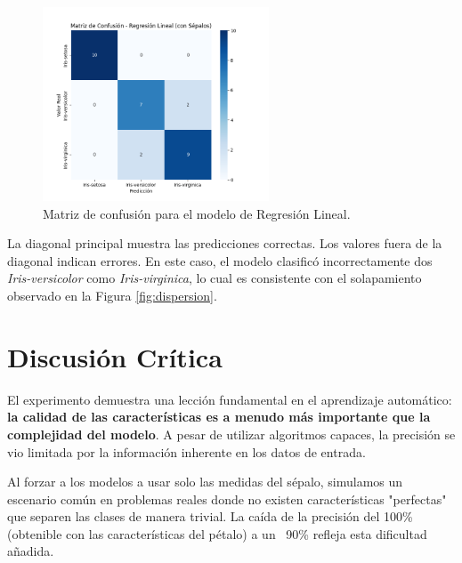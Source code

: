 \documentclass[12pt,a4paper]{article}
\begin{document}
\begin{figure}[H]
    \centering
    \includegraphics[width=0.6\textwidth]{Graficos/2_matriz_confusion.png}
    \caption{Matriz de confusión para el modelo de Regresión Lineal.}
    \label{fig:confusion}
\end{figure}

La diagonal principal muestra las predicciones correctas. Los valores fuera de la diagonal indican errores. En este caso, el modelo clasificó incorrectamente dos \textit{Iris-versicolor} como \textit{Iris-virginica}, lo cual es consistente con el solapamiento observado en la Figura \ref{fig:dispersion}.

\section{Discusión Crítica}
El experimento demuestra una lección fundamental en el aprendizaje automático: \textbf{la calidad de las características es a menudo más importante que la complejidad del modelo}. A pesar de utilizar algoritmos capaces, la precisión se vio limitada por la información inherente en los datos de entrada.

Al forzar a los modelos a usar solo las medidas del sépalo, simulamos un escenario común en problemas reales donde no existen características "perfectas" que separen las clases de manera trivial. La caída de la precisión del 100\% (obtenible con las características del pétalo) a un ~90\% refleja esta dificultad añadida.
\end{document}
